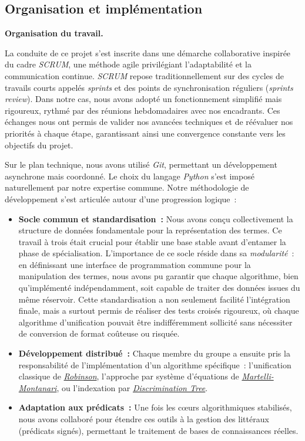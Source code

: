\documentclass[11pt]{article}
\newenvironment{paraph}[1]{%
  \medskip
  \noindent\textbf{#1.}\quad

  \vspace{0.2cm}
}{%
  \medskip
}
\begin{document}
\subsection{Organisation et implémentation}
\begin{paraph}{Organisation du travail}
    La conduite de ce projet s'est inscrite dans une démarche collaborative inspirée
    du cadre \textit{SCRUM}, une méthode agile privilégiant l'adaptabilité et la communication
    continue. \textit{SCRUM} repose traditionnellement sur des cycles de travails courts
    appelés \textit{sprints} et des points de synchronisation réguliers (\textit{sprints review}).
    Dans notre cas, nous avons adopté un fonctionnement simplifié mais rigoureux,
    rythmé par des réunions hebdomadaires avec nos encadrants. Ces échanges nous ont
    permis de valider nos avancées techniques et de réévaluer nos priorités à chaque
    étape, garantissant ainsi une convergence constante vers les objectifs du projet.

    Sur le plan technique, nous avons utilisé \textit{Git}, permettant un développement 
    asynchrone mais coordonné. Le choix du langage \textit{Python} s'est imposé 
    naturellement par notre expertise commune. Notre méthodologie de développement 
    s'est articulée autour d'une progression logique~:
    \begin{itemize}
        \item \textbf{Socle commun et standardisation~:} Nous avons conçu collectivement la structure 
        de données fondamentale pour la représentation des termes. Ce travail à 
        trois était crucial pour établir une base stable avant d'entamer la phase 
        de spécialisation. L'importance de ce socle réside dans sa 
        \textit{modularité}~: en définissant une interface de programmation commune 
        pour la manipulation des termes, nous avons pu garantir que chaque 
        algorithme, bien qu'implémenté indépendamment, soit capable de 
        traiter des données issues du même réservoir. Cette 
        standardisation a non seulement facilité l'intégration finale, mais a surtout 
        permis de réaliser des tests croisés rigoureux, où chaque algorithme 
        d'unification pouvait être indifféremment sollicité sans nécessiter 
        de conversion de format coûteuse ou risquée.
        \item \textbf{Développement distribué~:} Chaque membre du groupe a ensuite 
        pris la responsabilité de l'implémentation d'un algorithme spécifique~: 
        l'unification classique de \hyperref[sec:rob]{\textit{Robinson}}, l'approche par système 
        d'équations de \hyperref[sec:mm]{\textit{Martelli-Montanari}}, ou l'indexation par 
        \hyperref[sec:dt]{\textit{Discrimination Tree}}.
        \item \textbf{Adaptation aux prédicats~:} Une fois les cœurs algorithmiques 
        stabilisés, nous avons collaboré pour étendre ces outils à la gestion des 
        littéraux (prédicats signés), permettant le traitement de bases de 
        connaissances réelles.
    \end{itemize}
\end{paraph}
\end{document}
